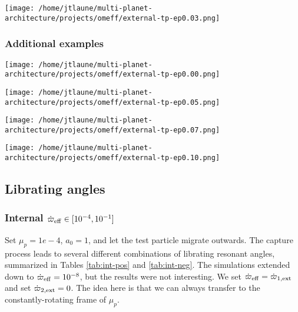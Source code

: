 \documentclass[11pt]{article}
\begin{document}
\begin{center}
\texttt{[image: /home/jtlaune/multi-planet-architecture/projects/omeff/external-tp-ep0.03.png]}
\end{center}

\subsubsection{Additional examples}
\label{sec:org564df2c}
\begin{center}
\texttt{[image: /home/jtlaune/multi-planet-architecture/projects/omeff/external-tp-ep0.00.png]}
\end{center}
\begin{center}
\texttt{[image: /home/jtlaune/multi-planet-architecture/projects/omeff/external-tp-ep0.05.png]}
\end{center}
\begin{center}
\texttt{[image: /home/jtlaune/multi-planet-architecture/projects/omeff/external-tp-ep0.07.png]}
\end{center}
\begin{center}
\texttt{[image: /home/jtlaune/multi-planet-architecture/projects/omeff/external-tp-ep0.10.png]}
\end{center}

\subsection{Librating angles}
\label{sec:org4a41a43}
\subsubsection{Internal \(\dot\varpi_{\rm eff}\in[10^{-4},10^{-1}]\)}
\label{sec:org92ac65e}
Set \(\mu_p=1e-4\), \(a_0=1\), and let the test particle migrate outwards.
The capture process leads to several different combinations of
librating resonant angles, summarized in Tables \ref{tab:int-pos} and
\ref{tab:int-neg}.  The simulations extended down to \(\dot\varpi_{\rm
eff}=10^{-8}\), but the results were not interesting.  We set
\(\dot\varpi_{\rm eff} = \dot\varpi_{1,\rm ext}\) and set
\(\dot\varpi_{2, \rm ext}=0\). The idea here is that we can always
transfer to the constantly-rotating frame of \(\mu_p\).
\end{document}
